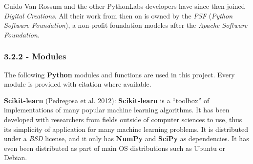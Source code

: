 \documentclass[]{article}
\begin{document}
Guido Van Rossum and the other PythonLabs developers have since then
joined \emph{Digital Creations}. All their work from then on is owned by
the \emph{PSF} (\emph{Python Software Foundation}), a non-profit
foundation modeles after the \emph{Apache Software Foundation}.

\subsubsection{3.2.2 - Modules}\label{modules}

The following \textbf{Python} modules and functions are used in this
project. Every module is provided with citation where available.

\textbf{Scikit-learn} (Pedregosa et al. 2012): \textbf{Scikit-learn} is
a ``toolbox'' of implementations of many popular machine learning
algorithms. It has been developed with researchers from fields outside
of computer sciences to use, thus its simplicity of application for many
machine learning problems. It is distributed under a \emph{BSD} license,
and it only has \textbf{NumPy} and \textbf{SciPy} as dependencies. It
has even been distributed as part of main OS distributions such as
Ubuntu or Debian.
\end{document}
